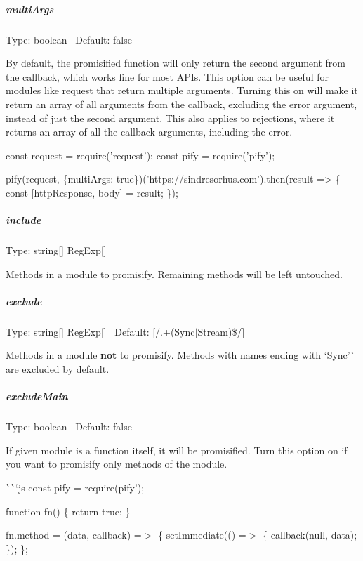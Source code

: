\subparagraph*{multi\+Args}

Type\+: {\ttfamily boolean}~\newline
 Default\+: {\ttfamily false}

By default, the promisified function will only return the second argument from the callback, which works fine for most A\+P\+Is. This option can be useful for modules like {\ttfamily request} that return multiple arguments. Turning this on will make it return an array of all arguments from the callback, excluding the error argument, instead of just the second argument. This also applies to rejections, where it returns an array of all the callback arguments, including the error.


\begin{DoxyCode}
const request = require('request');
const pify = require('pify');

pify(request, \{multiArgs: true\})('https://sindresorhus.com').then(result => \{
    const [httpResponse, body] = result;
\});
\end{DoxyCode}


\subparagraph*{include}

Type\+: {\ttfamily string\mbox{[}\mbox{]}} {\ttfamily Reg\+Exp\mbox{[}\mbox{]}}

Methods in a module to promisify. Remaining methods will be left untouched.

\subparagraph*{exclude}

Type\+: {\ttfamily string\mbox{[}\mbox{]}} {\ttfamily Reg\+Exp\mbox{[}\mbox{]}}~\newline
 Default\+: {\ttfamily \mbox{[}/.+(Sync$\vert$\+Stream)\$/\mbox{]}}

Methods in a module {\bfseries not} to promisify. Methods with names ending with `\textquotesingle{}Sync'\`{} are excluded by default.

\subparagraph*{exclude\+Main}

Type\+: {\ttfamily boolean}~\newline
 Default\+: {\ttfamily false}

If given module is a function itself, it will be promisified. Turn this option on if you want to promisify only methods of the module.

\`{}\`{}`js const pify = require(\textquotesingle{}pify');

function fn() \{ return true; \}

fn.\+method = (data, callback) =$>$ \{ set\+Immediate(() =$>$ \{ callback(null, data); \}); \};

